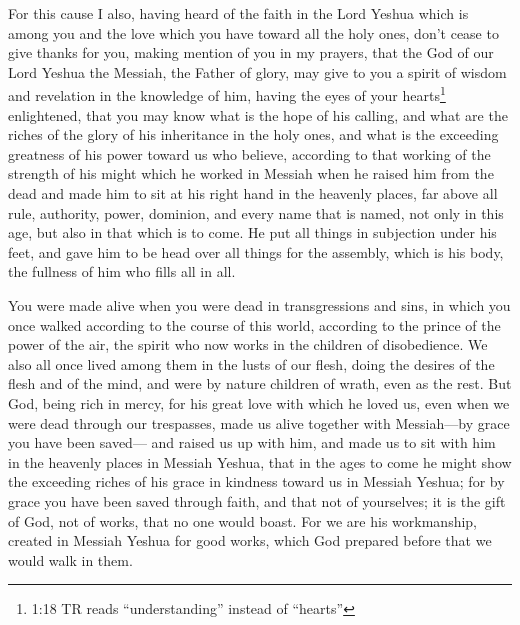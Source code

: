 \myverse{}For this cause I also, having heard of the faith in the Lord
Yeshua which is among you and the love which you have toward all the holy ones,
\myverse{}don’t cease to give thanks for you, making mention of you in my prayers,
\myverse{}that the God of our Lord Yeshua the Messiah, the Father of glory, may give
to you a spirit of wisdom and revelation in the knowledge of him,
\myverse{}having the eyes of your hearts\footnote{1:18 TR reads “understanding” instead of “hearts”} enlightened, that you may know what is
the hope of his calling, and what are the riches of the glory of his inheritance in the holy ones,
\myverse{}and what is the exceeding greatness of his power toward us who believe, according
to that working of the strength of his might
\myverse{}which he worked in Messiah when he raised him from the dead and made him to
sit at his right hand in the heavenly places,
\myverse{}far above all rule, authority, power, dominion, and every name that is named,
not only in this age, but also in that which is to come.
\myverse{}He put all things in subjection under his feet, and gave him to be head over
all things for the assembly,
\myverse{}which is his body, the fullness of him who fills all in all.


\mychapter{} \myverse*{}You were made alive when you were dead in transgressions and sins,
\myverse{}in which you once walked according to the course of this world, according to
the prince of the power of the air, the spirit who now works in the children of disobedience.
\myverse{}We also all once lived among them in the lusts of our flesh, doing the desires
of the flesh and of the mind, and were by nature children of wrath, even as the rest.
\myverse{}But God, being rich in mercy, for his great love with which he loved us,
\myverse{}even when we were dead through our trespasses, made us alive together with Messiah—by
grace you have been saved—
\myverse{}and raised us up with him, and made us to sit with him in the heavenly places
in Messiah Yeshua,
\myverse{}that in the ages to come he might show the exceeding riches of his grace in
kindness toward us in Messiah Yeshua;
\myverse{}for by grace you have been saved through faith, and that not of yourselves;
it is the gift of God,
\myverse{}not of works, that no one would boast.
\myverse{}For we are his workmanship, created in Messiah Yeshua for good works, which
God prepared before that we would walk in them.

